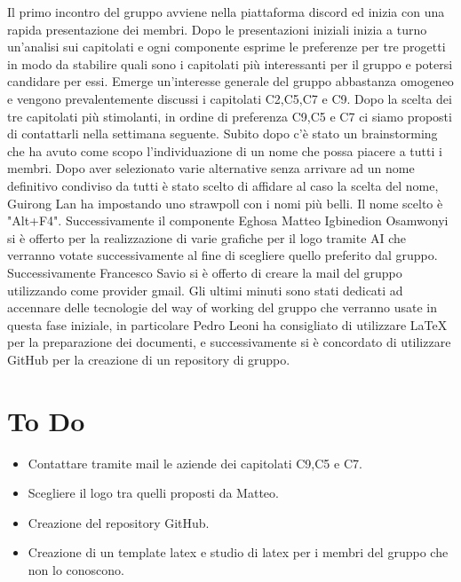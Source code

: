 \documentclass[a4paper, 12pt]{article}
\begin{document}
Il primo incontro del gruppo avviene nella piattaforma discord ed inizia con una rapida
presentazione dei membri.
Dopo le presentazioni iniziali inizia a turno un'analisi sui capitolati e ogni 
componente esprime le preferenze per tre progetti in modo da stabilire quali sono i capitolati più interessanti per il gruppo e potersi candidare per essi.
Emerge un'interesse generale del gruppo abbastanza omogeneo e vengono prevalentemente discussi i capitolati C2,C5,C7 e C9. Dopo la scelta dei tre capitolati più stimolanti, in ordine 
di preferenza C9,C5 e C7 ci siamo proposti di contattarli nella settimana seguente.
Subito dopo c'è stato un brainstorming che ha avuto come scopo l’individuazione di un nome che possa piacere a tutti i membri.
Dopo aver selezionato varie alternative senza arrivare ad un nome definitivo condiviso da tutti è stato scelto di affidare al caso la scelta del nome, Guirong Lan ha impostando uno strawpoll con i nomi più belli. Il nome scelto è "Alt+F4".
Successivamente il componente Eghosa Matteo Igbinedion Osamwonyi si è offerto per la realizzazione di varie grafiche per il logo tramite AI che verranno votate successivamente al fine di scegliere quello preferito dal gruppo.
Successivamente Francesco Savio si è offerto di creare la mail del gruppo utilizzando come provider gmail.
Gli ultimi minuti sono stati dedicati ad accennare delle tecnologie del way of working del gruppo che verranno usate in questa fase iniziale, in particolare Pedro Leoni ha consigliato di utilizzare LaTeX per la preparazione dei documenti, e successivamente si è concordato di utilizzare GitHub per la creazione di un repository di gruppo.


\section{To Do}
\begin{itemize}
    \item Contattare tramite mail le aziende dei capitolati C9,C5 e C7.
    \item Scegliere il logo tra quelli proposti da Matteo.
    \item Creazione del repository GitHub.
    \item Creazione di un template latex e studio di latex per i membri del gruppo che non lo conoscono.
\end{itemize}
\end{document}
